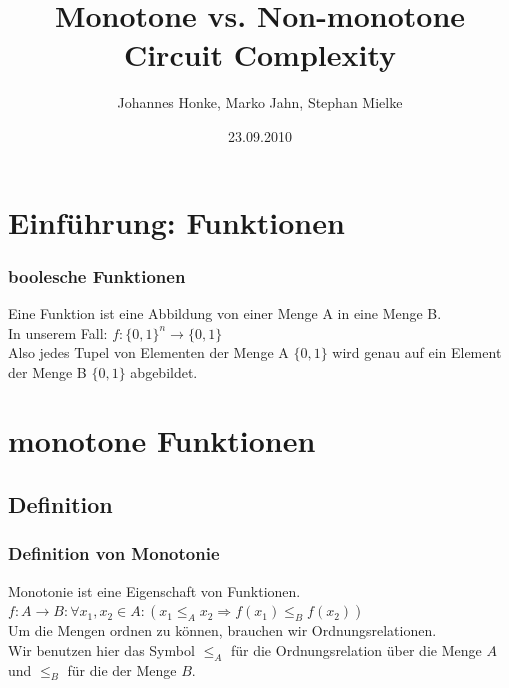 \documentclass[hyperref={pdfpagelabels=false}]{beamer} %
\title{Monotone vs. Non-monotone Circuit Complexity}
\author{Johannes Honke, Marko Jahn, Stephan Mielke}
\institute{BTU-Cottbus}
\date{23.09.2010}
\begin{document}
  \begin{frame}[plain]
    \titlepage
    \tableofcontents
  \end{frame}

  \section{Einführung: Funktionen}
  \begin{frame} %
    \frametitle{boolesche Funktionen}
    Eine Funktion ist eine Abbildung von einer Menge A in eine Menge B.\\
    In unserem Fall: $f: \{0,1\}^{n} \rightarrow \{0,1\}$ \\
    Also jedes Tupel von Elementen der Menge A $\{0, 1\}$ wird genau auf ein Element der Menge B $\{0, 1\}$ abgebildet.
  \end{frame}

  \section{monotone Funktionen}
  \subsection*{Definition}
  \begin{frame}%
    \frametitle{Definition von Monotonie}
    Monotonie ist eine Eigenschaft von Funktionen.\\
    $f:A \rightarrow B: \forall x_1,x_2 \in A : (x_1 \leq_A x_2 \Rightarrow f(x_1) \leq_B f(x_2))$\\
    Um die Mengen ordnen zu können, brauchen wir Ordnungsrelationen.\\
    Wir benutzen hier das Symbol $\leq_A$ für die Ordnungsrelation über die Menge $A$ und $\leq_B$ für die der Menge $B$.
  \end{frame}
\end{document}
